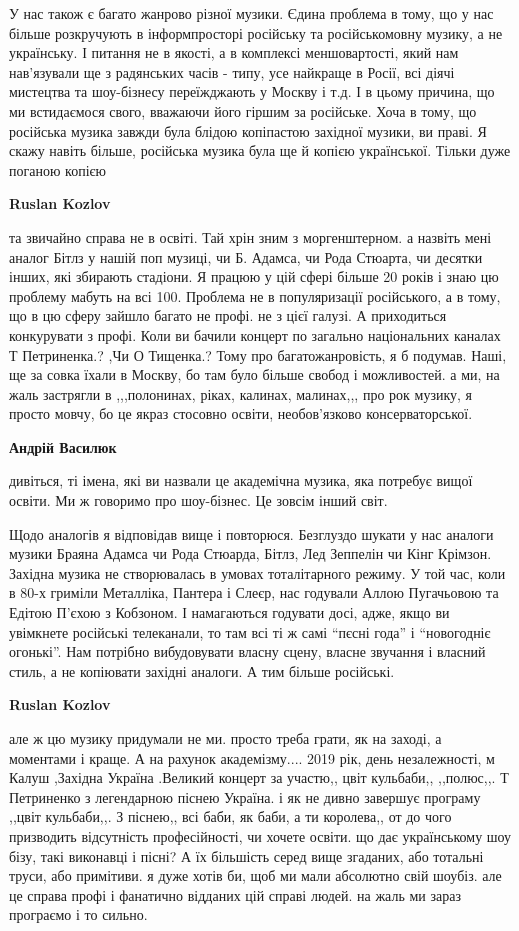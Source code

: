 \begin{itemize}
\begin{itemize}
У нас також є багато жанрово різної музики. Єдина проблема в тому, що у нас
більше розкручують в інформпросторі російську та російськомовну музику, а не
українську. І питання не в якості, а в комплексі меншовартості, який нам
нав'язували ще з радянських часів - типу, усе найкраще в Росії, всі діячі
мистецтва та шоу-бізнесу переїжджають у Москву і т.д. І в цьому причина, що ми
встидаємося свого, вважаючи його гіршим за російське. Хоча в тому, що російська
музика завжди була блідою копіпастою західної музики, ви праві. Я скажу навіть
більше, російська музика була ще й копією української. Тільки дуже поганою
копією

\textbf{Ruslan Kozlov} 

та звичайно справа не в освіті. Тай хрін зним з моргенштерном. а назвіть мені
аналог Бітлз у нашій поп музиці, чи Б. Адамса, чи Рода Стюарта, чи десятки
інших, які збирають стадіони. Я працюю у цій сфері більше 20 років і знаю цю
проблему мабуть на всі 100. Проблема не в популяризації російського, а в тому,
що в цю сферу зайшло багато не профі. не з цієї галузі. А приходиться конкурувати
з профі. Коли ви бачили концерт по загально національних каналах Т Петриненка.?
,Чи О Тищенка.? Тому про багатожанровість, я б подумав. Наші, ще за совка їхали
в Москву, бо там було більше свобод і можливостей. а ми, на жаль застрягли в
,,,полонинах, ріках, калинах, малинах,,, про рок музику, я просто мовчу, бо це
якраз стосовно освіти, необов'язково консерваторської.

\textbf{Андрій Василюк} 

дивіться, ті імена, які ви назвали це академічна музика, яка потребує вищої
освіти. Ми ж говоримо про шоу-бізнес. Це зовсім інший світ.

Щодо аналогів я відповідав вище і повторюся. Безглуздо шукати у нас аналоги
музики Браяна Адамса чи Рода Стюарда, Бітлз, Лед Зеппелін чи Кінг Крімзон.
Західна музика не створювалась в умовах тоталітарного режиму. У той час, коли в
80-х гриміли Металліка, Пантера і Слеєр, нас годували Аллою Пугачьовою та
Едітою П'єхою з Кобзоном. І намагаються годувати досі, адже, якщо ви увімкнете
російські телеканали, то там всі ті ж самі \enquote{пєсні года} і
\enquote{новогодніє огонькі}.  Нам потрібно вибудовувати власну сцену, власне
звучання і власний стиль, а не копіювати західні аналоги. А тим більше
російські.

\textbf{Ruslan Kozlov} 

але ж цю музику придумали не ми. просто треба грати, як на заході, а моментами і
краще. А на рахунок академізму.... 2019 рік, день незалежності, м Калуш ,Західна
Україна .Великий концерт за участю,, цвіт кульбаби,, ,,полюс,,. Т Петриненко з
легендарною піснею Україна. і як не дивно завершує програму ,,цвіт кульбаби,,. З
піснею,, всі баби, як баби, а ти королева,, от до чого призводить відсутність
професійності, чи хочете освіти. що дає українському шоу бізу, такі виконавці і
пісні? А їх більшість серед вище згаданих, або тотальні труси, або примітиви. я
дуже хотів би, щоб ми мали абсолютно свій шоубіз. але це справа профі і фанатично
відданих цій справі людей. на жаль ми зараз програємо і то сильно.



\end{itemize}
\end{itemize}
